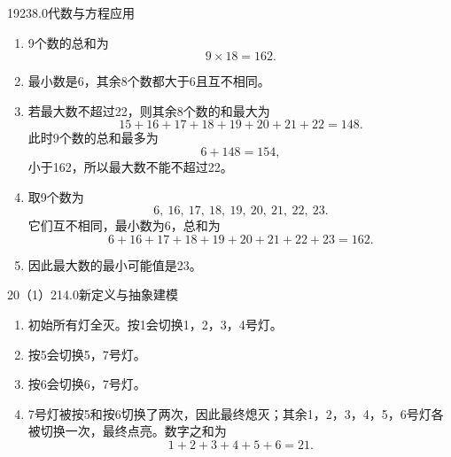 \begin{solution}{19}{23}{8.0}{代数与方程应用}
\begin{enumerate}[label=\textbf{Step \arabic*:},leftmargin=*]
  \item 9个数的总和为
  \[
    9\times18=162.
  \]
  \item 最小数是6，其余8个数都大于6且互不相同。
  \item 若最大数不超过22，则其余8个数的和最大为
  \[
    15+16+17+18+19+20+21+22=148.
  \]
  此时9个数的总和最多为
  \[
    6+148=154,
  \]
  小于162，所以最大数不能不超过22。
  \item 取9个数为
  \[
    6,\ 16,\ 17,\ 18,\ 19,\ 20,\ 21,\ 22,\ 23.
  \]
  它们互不相同，最小数为6，总和为
  \[
    6+16+17+18+19+20+21+22+23=162.
  \]
  \item 因此最大数的最小可能值是23。
\end{enumerate}
\end{solution}


\begin{solution}{20（1）}{21}{4.0}{新定义与抽象建模}
\begin{enumerate}[label=\textbf{Step \arabic*:},leftmargin=*]
  \item 初始所有灯全灭。按1会切换1，2，3，4号灯。
  \item 按5会切换5，7号灯。
  \item 按6会切换6，7号灯。
  \item 7号灯被按5和按6切换了两次，因此最终熄灭；其余1，2，3，4，5，6号灯各被切换一次，最终点亮。数字之和为
  \[
    1+2+3+4+5+6=21.
  \]
\end{enumerate}
\end{solution}

